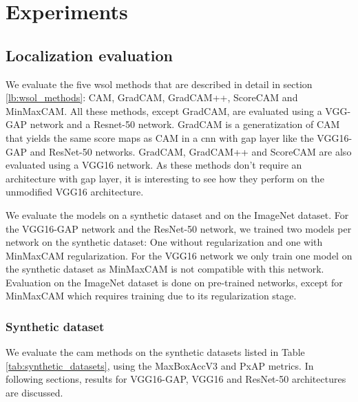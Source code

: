 \chapter{Experiments}



\section{Localization evaluation}
We evaluate the five \acrshort{wsol} methods that are described in detail in section \ref{lb:wsol_methods}: CAM, GradCAM, GradCAM++, ScoreCAM and MinMaxCAM. All these methods, except GradCAM, are evaluated using a VGG-GAP network and a Resnet-50 network. GradCAM is a generatization of CAM that yields the same score maps as CAM in a \acrshort{cnn} with \acrshort{gap} layer like the VGG16-GAP and ResNet-50 networks. GradCAM, GradCAM++ and ScoreCAM are also evaluated using a VGG16 network. As these methods don't require an architecture with \acrshort{gap} layer, it is interesting to see how they perform on the unmodified VGG16 architecture.

We evaluate the models on a synthetic dataset and on the ImageNet dataset. For the VGG16-GAP network and the ResNet-50 network, we trained two models per network on the synthetic dataset: One without regularization and one with MinMaxCAM regularization. For the VGG16 network we only train one model on the synthetic dataset as MinMaxCAM is not compatible with this network. Evaluation on the ImageNet dataset is done on pre-trained networks, except for MinMaxCAM which requires training due to its regularization stage.

\subsection{Synthetic dataset}
We evaluate the \acrshort{cam} methods on the synthetic datasets listed in Table \ref{tab:synthetic_datasets}, using the MaxBoxAccV3 and PxAP metrics. In following sections, results for VGG16-GAP, VGG16 and ResNet-50 architectures are discussed.

